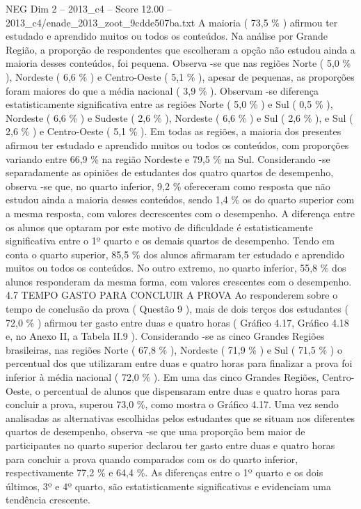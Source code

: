 \begin{textsample}{NEG Dim 2 – 2013\_c4 – Score 12.00 – 2013\_c4/enade\_2013\_zoot\_9cdde507ba.txt}
A maioria ( 73,5 \% ) afirmou ter estudado e aprendido muitos ou todos os conteúdos.
Na análise por Grande Região, a proporção de respondentes que escolheram a opção não estudou ainda a maioria desses conteúdos, foi pequena.
Observa -se que nas regiões Norte ( 5,0 \% ), Nordeste ( 6,6 \% ) e Centro-Oeste ( 5,1 \% ), apesar de pequenas, as proporções foram maiores do que a média nacional ( 3,9 \% ).
Observam -se diferença estatisticamente significativa entre as regiões Norte ( 5,0 \% ) e Sul ( 0,5 \% ), Nordeste ( 6,6 \% ) e Sudeste ( 2,6 \% ), Nordeste ( 6,6 \% ) e Sul ( 2,6 \% ), e Sul ( 2,6 \% ) e Centro-Oeste ( 5,1 \% ).
Em todas as regiões, a maioria dos presentes afirmou ter estudado e aprendido muitos ou todos os conteúdos, com proporções variando entre 66,9 \% na região Nordeste e 79,5 \% na Sul.
Considerando -se separadamente as opiniões de estudantes dos quatro quartos de desempenho, observa -se que, no quarto inferior, 9,2 \% ofereceram como resposta que não estudou ainda a maioria desses conteúdos, sendo 1,4 \% os do quarto superior com a mesma resposta, com valores decrescentes com o desempenho.
A diferença entre os alunos que optaram por este motivo de dificuldade é estatisticamente significativa entre o 1º quarto e os demais quartos de desempenho.
Tendo em conta o quarto superior, 85,5 \% dos alunos afirmaram ter estudado e aprendido muitos ou todos os conteúdos.
No outro extremo, no quarto inferior, 55,8 \% dos alunos responderam da mesma forma, com valores crescentes com o desempenho. 4.7 TEMPO GASTO PARA CONCLUIR A PROVA Ao responderem sobre o tempo de conclusão da prova ( Questão 9 ), mais de dois terços dos estudantes ( 72,0 \% ) afirmou ter gasto entre duas e quatro horas ( Gráfico 4.17, Gráfico 4.18 e, no Anexo II, a Tabela II.9 ).
Considerando -se as cinco Grandes Regiões brasileiras, nas regiões Norte ( 67,8 \% ), Nordeste ( 71,9 \% ) e Sul ( 71,5 \% ) o percentual dos que utilizaram entre duas e quatro horas para finalizar a prova foi inferior à média nacional ( 72,0 \% ).
Em uma das cinco Grandes Regiões, Centro-Oeste, o percentual de alunos que dispensaram entre duas e quatro horas para concluir a prova, superou 73,0 \%, como mostra o Gráfico 4.17.
Uma vez sendo analisadas as alternativas escolhidas pelos estudantes que se situam nos diferentes quartos de desempenho, observa -se que uma proporção bem maior de participantes no quarto superior declarou ter gasto entre duas e quatro horas para concluir a prova quando comparados com os do quarto inferior, respectivamente 77,2 \% e 64,4 \%.
As diferenças entre o 1º quarto e os dois últimos, 3º e 4º quarto, são estatisticamente significativas e evidenciam uma tendência crescente.

\end{textsample}
